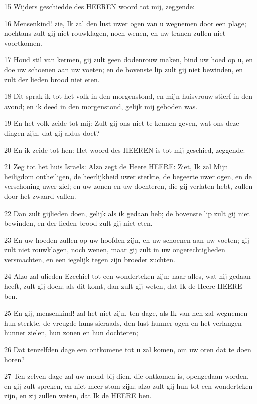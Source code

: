 \par 15 Wijders geschiedde des HEEREN woord tot mij, zeggende:
\par 16 Mensenkind! zie, Ik zal den lust uwer ogen van u wegnemen door een plage; nochtans zult gij niet rouwklagen, noch wenen, en uw tranen zullen niet voortkomen.
\par 17 Houd stil van kermen, gij zult geen dodenrouw maken, bind uw hoed op u, en doe uw schoenen aan uw voeten; en de bovenste lip zult gij niet bewinden, en zult der lieden brood niet eten.
\par 18 Dit sprak ik tot het volk in den morgenstond, en mijn huisvrouw stierf in den avond; en ik deed in den morgenstond, gelijk mij geboden was.
\par 19 En het volk zeide tot mij: Zult gij ons niet te kennen geven, wat ons deze dingen zijn, dat gij aldus doet?
\par 20 En ik zeide tot hen: Het woord des HEEREN is tot mij geschied, zeggende:
\par 21 Zeg tot het huis Israels: Alzo zegt de Heere HEERE: Ziet, Ik zal Mijn heiligdom ontheiligen, de heerlijkheid uwer sterkte, de begeerte uwer ogen, en de verschoning uwer ziel; en uw zonen en uw dochteren, die gij verlaten hebt, zullen door het zwaard vallen.
\par 22 Dan zult gijlieden doen, gelijk als ik gedaan heb; de bovenste lip zult gij niet bewinden, en der lieden brood zult gij niet eten.
\par 23 En uw hoeden zullen op uw hoofden zijn, en uw schoenen aan uw voeten; gij zult niet rouwklagen, noch wenen, maar gij zult in uw ongerechtigheden versmachten, en een iegelijk tegen zijn broeder zuchten.
\par 24 Alzo zal ulieden Ezechiel tot een wonderteken zijn; naar alles, wat hij gedaan heeft, zult gij doen; als dit komt, dan zult gij weten, dat Ik de Heere HEERE ben.
\par 25 En gij, mensenkind! zal het niet zijn, ten dage, als Ik van hen zal wegnemen hun sterkte, de vreugde huns sieraads, den lust hunner ogen en het verlangen hunner zielen, hun zonen en hun dochteren;
\par 26 Dat tenzelfden dage een ontkomene tot u zal komen, om uw oren dat te doen horen?
\par 27 Ten zelven dage zal uw mond bij dien, die ontkomen is, opengedaan worden, en gij zult spreken, en niet meer stom zijn; alzo zult gij hun tot een wonderteken zijn, en zij zullen weten, dat Ik de HEERE ben.

